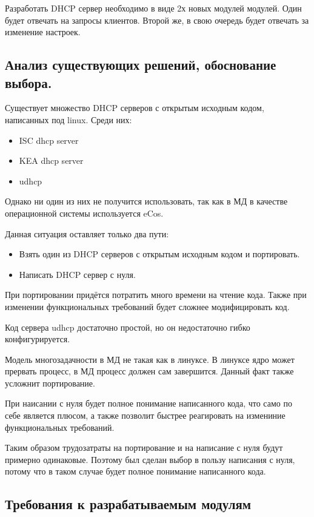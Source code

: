 \documentclass[14pt]{extarticle}
\begin{document}
Разработать DHCP сервер необходимо в виде 2х новых модулей модулей.
Один будет отвечать на запросы клиентов.
Второй же, в свою очередь будет отвечать за изменение настроек.

\subsection{Анализ существующих решений, обоснование выбора.}

Существует множество DHCP серверов с открытым исходным кодом, написанных под linux. Среди них:
\begin{itemize}
    \item ISC dhcp server
    \item KEA dhcp server
    \item udhcp
\end{itemize}

Однако ни один из них не получится использовать, так как в МД в качестве операционной системы используется eCos.

Данная ситуация оставляет только два пути:

\begin{itemize}
    \item Взять один из DHCP серверов с открытым исходным кодом и портировать.
    \item Написать DHCP сервер с нуля.
\end{itemize}

При портировании придётся потратить много времени на чтение кода.
Также при изменении функциональных требований будет сложнее модифицировать код.

Код сервера udhcp достаточно простой, но он недостаточно гибко конфигурируется.

Модель многозадачности в МД не такая как в линуксе.
В линуксе ядро может прервать процесс, в МД процесс должен сам завершится.
Данный факт также усложнит портирование.

При наисании с нуля будет полное понимание написанного кода, что само по себе является плюсом, а также позволит быстрее реагировать на измениние функциональных требований.

Таким образом трудозатраты на портирование и на написание с нуля будут примерно одинаковые.
Поэтому был сделан выбор в пользу написания с нуля, потому что в таком случае будет полное понимание написанного кода.

\subsection{Требования к разрабатываемым модулям}
\end{document}
